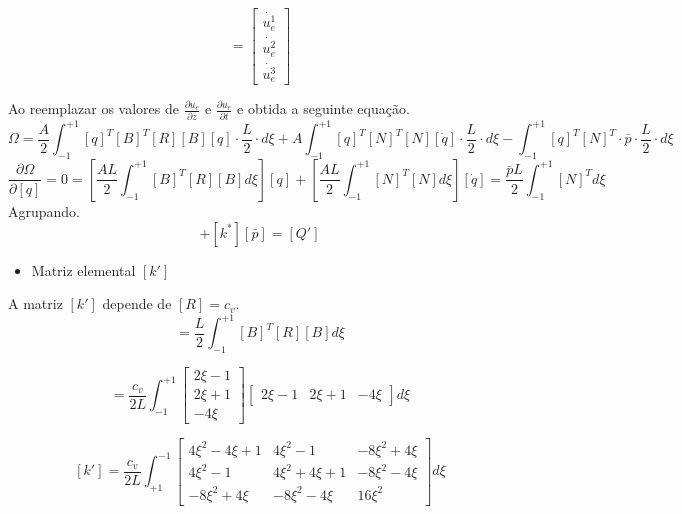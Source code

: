 \documentclass{article} %
\begin{document}
\begin{equation}
[\dot{q}]=\begin{bmatrix}
\dot{u_e^1}\\\dot{u_e^2}\\\dot{u_e^3}
\end{bmatrix}
\end{equation}

Ao reemplazar os valores de \(\frac{\partial u_e}{\partial z}\) e \(\frac{\partial u_e}{\partial t}\) e obtida a seguinte equação.
\begin{equation}
\Omega=\frac{A}{2}\int_{-1}^{+1}[q]^T[B]^T[R][B][q]\cdot\frac{L}{2}\cdot d\xi+A\int_{-1}^{+1}[q]^T[N]^T[N][\dot{q}]\cdot\frac{L}{2}\cdot d\xi-\int_{-1}^{+1}[q]^T[N]^T\cdot \bar{p}\cdot\frac{L}{2}\cdot d\xi
\end{equation}
\begin{equation}\label{der}
\frac{\partial \Omega}{\partial [q]}=0=\left[\frac{AL}{2}\int_{-1}^{+1}[B]^T[R][B]d\xi\right][q]+\left[\frac{AL}{2}\int_{-1}^{+1}[N]^T[N]d\xi\right][\dot{q}]=\frac{\bar{p}L}{2}\int_{-1}^{+1}[N]^Td\xi
\end{equation}
Agrupando.
\begin{equation}
[k'][q]+[k^*][\bar{p}]=[Q']
\end{equation}


\begin{itemize}
	\item Matriz elemental \([k']\)	
\end{itemize}


A matriz \([k']\) depende de \([R]=c_v\).
\begin{equation*}
[k']=\frac{L}{2}\int_{-1}^{+1}[B]^T[R][B]d\xi
\end{equation*}

\begin{equation*}
[k']=\frac{c_v}{2L}\int_{-1}^{+1}\begin{bmatrix}
2\xi-1\\2\xi+1\\-4\xi
\end{bmatrix}\begin{bmatrix}
2\xi-1&2\xi+1&-4\xi
\end{bmatrix}d\xi
\end{equation*}



\begin{equation*}\label{}
[k']=\frac{c_v}{2L} \int_{+1}^{-1}\begin{bmatrix}
4\xi^2-4\xi+1&4\xi^2-1&-8\xi^2+4\xi\\
4\xi^2-1&4\xi^2+4\xi+1&-8\xi^2-4\xi\\
-8\xi^2+4\xi&-8\xi^2-4\xi&16\xi^2
\end{bmatrix}d\xi
\end{equation*}
\end{document}
